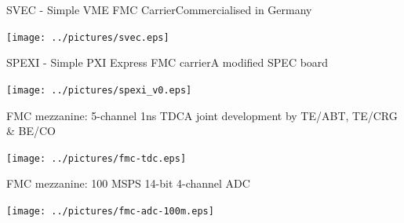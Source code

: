 \documentclass[compress,red]{beamer}
\begin{document}
\begin{frame}{SVEC - Simple VME FMC Carrier}{Commercialised in Germany}

  \begin{center}
    \texttt{[image: ../pictures/svec.eps]}
  \end{center}

  \note[item]{}

\end{frame}

\begin{frame}{SPEXI - Simple PXI Express FMC carrier}{A modified SPEC board}

  \begin{center}
    \texttt{[image: ../pictures/spexi\_v0.eps]}
  \end{center}

  \note[item]{}

\end{frame}

\begin{frame}{FMC mezzanine: 5-channel 1ns TDC}{A joint development by TE/ABT, TE/CRG \& BE/CO}

  \begin{center}
    \texttt{[image: ../pictures/fmc-tdc.eps]}
  \end{center}

  \note[item]{}

\end{frame}

\begin{frame}{FMC mezzanine: 100 MSPS 14-bit 4-channel ADC}

  \begin{center}
    \texttt{[image: ../pictures/fmc-adc-100m.eps]}
  \end{center}

  \note[item]{}

\end{frame}
\end{document}
